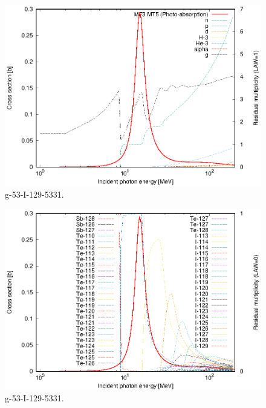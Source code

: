 \begin{figure}
 \includegraphics[width=\linewidth]{eps/g_53-I-129_5331.eps}
  \caption{g-53-I-129-5331.}
\end{figure}
\begin{figure}
 \includegraphics[width=\linewidth]{eps-law0/g_53-I-129_5331.eps}
 \caption{g-53-I-129-5331.}
\end{figure}
\newpage \clearpage

